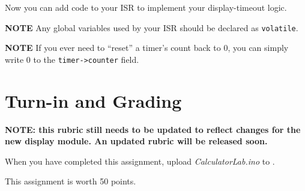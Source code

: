 Now you can add code to your ISR to implement your display-timeout logic.

\textbf{NOTE} Any global variables used by your ISR should be declared as \lstinline{volatile}.

\textbf{NOTE} If you ever need to ``reset'' a timer's count back to 0, you can
simply write 0 to the \lstinline{timer->counter} field.




\section{Turn-in and Grading}

\textbf{NOTE: this rubric still needs to be updated to reflect changes for the new display module. An updated rubric will be released soon.}

When you have completed this assignment, upload \textit{CalculatorLab.ino} to
\filesubmission.

This assignment is worth 50 points. \\

